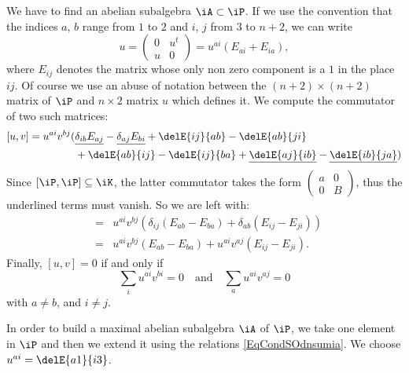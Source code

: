 We have to find an abelian subalgebra $\iA\subset\iP$. If we use the convention that the indices $a$, $b$ range from $1$ to $2$ and $i$, $j$ from $3$ to $n+2$, we can write
\begin{equation}
    u=\begin{pmatrix}
0 & u^t \\
u & 0
\end{pmatrix}=u^{ai}(E_{ai}+E_{ia}),
\end{equation}
where $E_{ij}$ denotes the matrix whose only non zero component is a $1$ in the place $ij$. Of course we use an abuse of notation between the $(n+2)\times(n+2)$ matrix of $\iP$ and $n\times 2$ matrix $u$ which defines it. We compute the commutator of two such matrices:
\begin{equation}
\begin{split}
[u,v]=u^{ai}v^{bj}(&\underline{\delta_{ib}E_{aj}}-\underline{\delta_{aj}E_{bi}}+\delE{ij}{ab}-\delE{ab}{ji}\\
&+ \delE{ab}{ij}-\delE{ij}{ba}+\underline{\delE{aj}{ib}}-\underline{\delE{ib}{ja}})
\end{split}
\end{equation}
Since $[\iP,\iP]\subseteq\iK$, the latter commutator takes the form $\begin{pmatrix}
a & 0 \\
0 & B
\end{pmatrix}$, thus the underlined terms must vanish. So we are left with:
\begin{eqnarray}
[u,v]&=&u^{ai}v^{bj}(\delta_{ij}(E_{ab}-E_{ba})+\delta_{ab}(E_{ij}-E_{ji}))\\
     &=&u^{ai}v^{bj} (E_{ab}-E_{ba})+u^{ai}v^{aj} (E_{ij}-E_{ji}).
\end{eqnarray}
Finally, $[u,v]=0$ if and only if 
\begin{equation} \label{EqCondSOdnsumia}
\sum_iu^{ai}v^{bi}=0\quad\text{and}\quad \sum_au^{ai}v^{aj}=0
\end{equation}
 with $a\neq b$, and $i\neq j$.

In order to build a maximal abelian subalgebra $\iA$ of $\iP$, we take one element in $\iP$ and then we extend it using the relations \eqref{EqCondSOdnsumia}. We choose $u^{ai}=\delE{a1}{i3}$.


